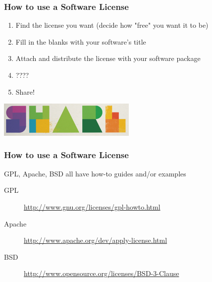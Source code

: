\documentclass{beamer}
\begin{document}
\begin{frame}
  \frametitle{How to use a Software License}
  \begin{enumerate}
  \item Find the license you want (decide how "free" you want it to be)
  \item Fill in the blanks with your software's title
  \item Attach and distribute the license with your software package
  \item ????
    \pause
  \item Share!
  \end{enumerate}
  \begin{center} 
    \includegraphics[width=0.5\textwidth]{../img/share} 
  \end{center}
\end{frame}

\begin{frame}
  \frametitle{How to use a Software License}
  \begin{Large}
    GPL, Apache, BSD all have how-to guides and/or examples
    \begin{description}
    \item[GPL]
      \href{http://www.gnu.org/licenses/gpl-howto.html}{http://www.gnu.org/licenses/gpl-howto.html}
    \item[Apache]
      \href{http://www.apache.org/dev/apply-license.html}{http://www.apache.org/dev/apply-license.html}
    \item[BSD]
      \href{http://www.opensource.org/licenses/BSD-3-Clause}{http://www.opensource.org/licenses/BSD-3-Clause}
    \end{description}
  \end{Large}

\end{frame}
\end{document}

